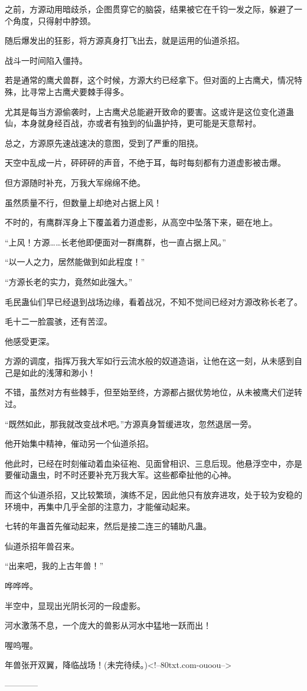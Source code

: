 \begin{this_body}
之前，方源动用暗歧杀，企图贯穿它的脑袋，结果被它在千钧一发之际，躲避了一个角度，只得射中脖颈。

随后爆发出的狂影，将方源真身打飞出去，就是运用的仙道杀招。

战斗一时间陷入僵持。

若是通常的鹰犬兽群，这个时候，方源大约已经拿下。但对面的上古鹰犬，情况特殊，比寻常上古鹰犬要棘手得多。

尤其是每当方源偷袭时，上古鹰犬总能避开致命的要害。这或许是这位变化道蛊仙，本身就身经百战，亦或者有独到的仙蛊护持，更可能是天意帮衬。

总之，方源原先速战速决的意图，受到了严重的阻挠。

天空中乱成一片，砰砰砰的声音，不绝于耳，每时每刻都有力道虚影被击爆。

但方源随时补充，万我大军绵绵不绝。

虽然质量不行，但数量上却绝对占据上风！

不时的，有鹰群浑身上下覆盖着力道虚影，从高空中坠落下来，砸在地上。

“上风！方源……长老他即便面对一群鹰群，也一直占据上风。”

“以一人之力，居然能做到如此程度！”

“方源长老的实力，竟然如此强大。”

毛民蛊仙们早已经退到战场边缘，看着战况，不知不觉间已经对方源改称长老了。

毛十二一脸震骇，还有苦涩。

他感受更深。

方源的调度，指挥万我大军如行云流水般的奴道造诣，让他在这一刻，从未感到自己是如此的浅薄和渺小！

不错，虽然对方有些棘手，但至始至终，方源都占据优势地位，从未被鹰犬们逆转过。

“既然如此，那我就改变战术吧。”方源真身暂缓进攻，忽然退居一旁。

他开始集中精神，催动另一个仙道杀招。

他此时，已经在时刻催动着血染征袍、见面曾相识、三息后现。他悬浮空中，亦是要催动蛊虫，时不时还要补充万我大军。这些都牵扯他的心神。

而这个仙道杀招，又比较繁琐，演练不足，因此他只有放弃进攻，处于较为安稳的环境中，再集中几乎全部的注意力，才能催动起来。

七转的年蛊首先催动起来，然后是接二连三的辅助凡蛊。

仙道杀招年兽召来。

“出来吧，我的上古年兽！”

哗哗哗。

半空中，显现出光阴长河的一段虚影。

河水激荡不息，一个庞大的兽影从河水中猛地一跃而出！

喔呜喔。

年兽张开双翼，降临战场！(未完待续。)<!--80txt.com-ouoou-->

------------

\end{this_body}

